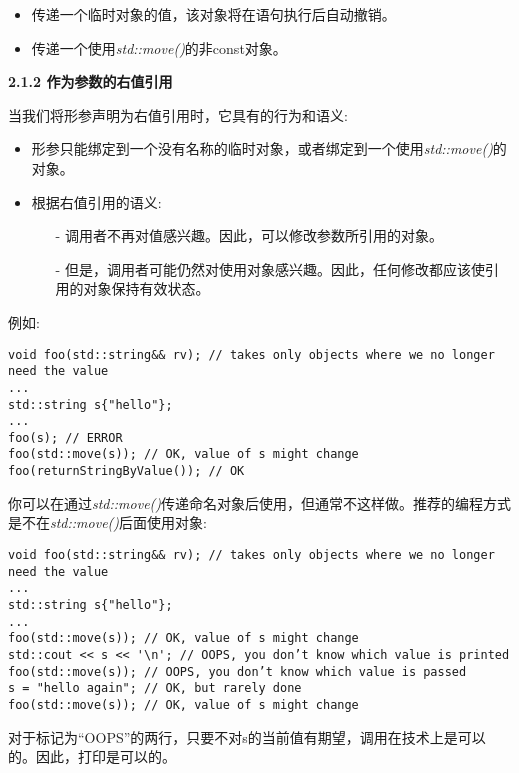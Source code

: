 \begin{itemize}
	\item 传递一个临时对象的值，该对象将在语句执行后自动撤销。
	\item 传递一个使用\textit{std::move()}的非const对象。
\end{itemize}

\hspace*{\fill} \par %
\textbf{2.1.2 作为参数的右值引用}

当我们将形参声明为右值引用时，它具有的行为和语义:\par

\begin{itemize}
	\item 形参只能绑定到一个没有名称的临时对象，或者绑定到一个使用\textit{std::move()}的对象。
	\item 根据右值引用的语义:
	\begin{itemize}
		\item[-] 调用者不再对值感兴趣。因此，可以修改参数所引用的对象。
		\item[-] 但是，调用者可能仍然对使用对象感兴趣。因此，任何修改都应该使引用的对象保持有效状态。
	\end{itemize}	
\end{itemize}

例如:\par

\begin{lstlisting}[caption={}]
void foo(std::string&& rv); // takes only objects where we no longer need the value
...
std::string s{"hello"};
...
foo(s); // ERROR
foo(std::move(s)); // OK, value of s might change
foo(returnStringByValue()); // OK
\end{lstlisting}

你可以在通过\textit{std::move()}传递命名对象后使用，但通常不这样做。推荐的编程方式是不在\textit{std::move()}后面使用对象:\par

\begin{lstlisting}[caption={}]
void foo(std::string&& rv); // takes only objects where we no longer need the value
...
std::string s{"hello"};
...
foo(std::move(s)); // OK, value of s might change
std::cout << s << '\n'; // OOPS, you don’t know which value is printed
foo(std::move(s)); // OOPS, you don’t know which value is passed
s = "hello again"; // OK, but rarely done
foo(std::move(s)); // OK, value of s might change
\end{lstlisting}

对于标记为“OOPS”的两行，只要不对s的当前值有期望，调用在技术上是可以的。因此，打印是可以的。\par




